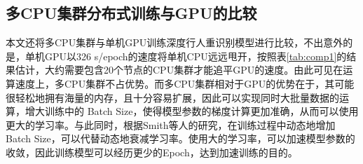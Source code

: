 \subsection{多CPU集群分布式训练与GPU的比较}

本文还将多CPU集群与单机GPU训练深度行人重识别模型进行比较，不出意外的是，单机GPU以326 s/epoch的速度将单机CPU远远甩开，按照表\ref{tab:comp1}的结果估计，大约需要包含20个节点的CPU集群才能追平GPU的速度。由此可见在运算速度上，多CPU集群不占优势。而多CPU集群相对于GPU的优势在于，其可能很轻松地拥有海量的内存，且十分容易扩展，因此可以实现同时大批量数据的运算，增大训练中的 Batch Size，使得模型参数的梯度计算更加准确，从而可以使用更大的学习率。与此同时，根据Smith等人\cite{smith2017don}的研究，在训练过程中动态地增加Batch Size，可以代替动态地衰减学习率。使用大的学习率，可以加速模型参数的收敛，因此训练模型可以经历更少的Epoch，达到加速训练的目的。


